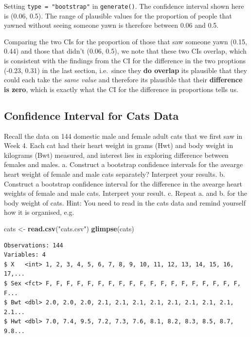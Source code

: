 \documentclass[]{article}
\newenvironment{Shaded}{\begin{snugshade}}{\end{snugshade}}
\newcommand{\KeywordTok}[1]{\textcolor[rgb]{0.13,0.29,0.53}{\textbf{#1}}}
\newcommand{\StringTok}[1]{\textcolor[rgb]{0.31,0.60,0.02}{#1}}
\newcommand{\NormalTok}[1]{#1}
\begin{document}
Setting \texttt{type\ =\ "bootstrap"} in \texttt{generate()}. The
confidence interval shown here is (0.06, 0.5). The range of plausible
values for the proportion of people that yawned without seeing someone
yawn is therefore between 0.06 and 0.5.

Comparing the two CIs for the proportion of those that saw someone yawn
(0.15, 0.44) and those that didn't (0.06, 0.5), we note that these two
CIs overlap, which is consistent with the findings from the CI for the
difference in the two proptions (-0.23, 0.31) in the last section,
i.e.~since they \textbf{do overlap} its plausible that they could each
take the \emph{same value} and therefore its plausible that their
\textbf{difference is zero}, which is exactly what the CI for the
difference in proportions tells us.

\subsection{Confidence Interval for Cats
Data}\label{confidence-interval-for-cats-data}

Recall the data on 144 domestic male and female adult cats that we first
saw in Week 4. Each cat had their heart weight in grams (Hwt) and body
weight in kilograms (Bwt) measured, and interest lies in exploring
difference between females and males. a. Construct a bootstrap
confidence intervals for the avearge heart weight of female and male
cats separately? Interpret your results. b. Construct a bootstrap
confidence interval for the difference in the avearge heart weights of
female and male cats. Interpret your result. c. Repeat a. and b. for the
body weight of cats. Hint: You need to read in the cats data and remind
yourself how it is organised, e.g.

\begin{Shaded}
\begin{Highlighting}[]
\NormalTok{cats <-}\StringTok{ }\KeywordTok{read.csv}\NormalTok{(}\StringTok{"cats.csv"}\NormalTok{)}
\KeywordTok{glimpse}\NormalTok{(cats)}
\end{Highlighting}
\end{Shaded}

\begin{verbatim}
Observations: 144
Variables: 4
$ X   <int> 1, 2, 3, 4, 5, 6, 7, 8, 9, 10, 11, 12, 13, 14, 15, 16, 17,...
$ Sex <fct> F, F, F, F, F, F, F, F, F, F, F, F, F, F, F, F, F, F, F, F...
$ Bwt <dbl> 2.0, 2.0, 2.0, 2.1, 2.1, 2.1, 2.1, 2.1, 2.1, 2.1, 2.1, 2.1...
$ Hwt <dbl> 7.0, 7.4, 9.5, 7.2, 7.3, 7.6, 8.1, 8.2, 8.3, 8.5, 8.7, 9.8...
\end{verbatim}
\end{document}
